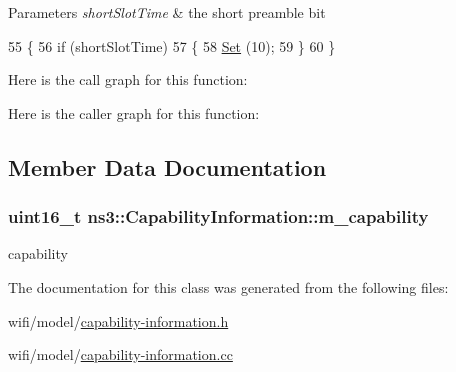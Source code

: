 \begin{DoxyParams}{Parameters}
{\em short\+Slot\+Time} & the short preamble bit \\
\hline
\end{DoxyParams}

\begin{DoxyCode}
55 \{
56   \textcolor{keywordflow}{if} (shortSlotTime)
57     \{
58       \hyperlink{classns3_1_1CapabilityInformation_a8f11df0c93af6bb7d50a91900add13fc}{Set} (10);
59     \}
60 \}
\end{DoxyCode}


Here is the call graph for this function\+:




Here is the caller graph for this function\+:




\subsection{Member Data Documentation}
\subsubsection[{\texorpdfstring{m\+\_\+capability}{m_capability}}]{\setlength{\rightskip}{0pt plus 5cm}uint16\+\_\+t ns3\+::\+Capability\+Information\+::m\+\_\+capability\hspace{0.3cm}{\ttfamily [private]}}\hypertarget{classns3_1_1CapabilityInformation_a3c77fc103e4988e095eb2aa8c1c42048}{}\label{classns3_1_1CapabilityInformation_a3c77fc103e4988e095eb2aa8c1c42048}


capability 



The documentation for this class was generated from the following files\+:\begin{DoxyCompactItemize}
\item 
wifi/model/\hyperlink{capability-information_8h}{capability-\/information.\+h}\item 
wifi/model/\hyperlink{capability-information_8cc}{capability-\/information.\+cc}\end{DoxyCompactItemize}

